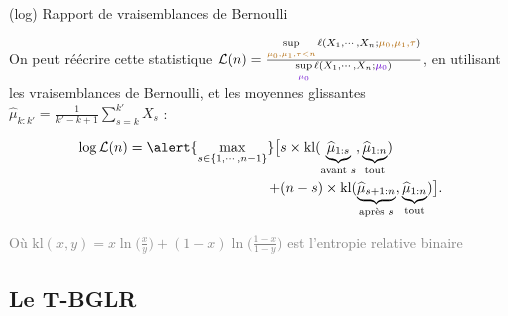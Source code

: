\documentclass[11pt,french,ignorenonframetext,]{beamer}
\begin{document}
\begin{frame}{(log) Rapport de vraisemblances de Bernoulli}

  On peut réécrire cette statistique
  $\mathcal{L}(n) = \frac{\sup\limits_{\textcolor{gold}{\mu_0,\mu_1,\tau < n}}\ell(X_1,\cdots,X_n ; \textcolor{gold}{\mu_0,\mu_1,\tau})}{\sup\limits_{\textcolor{deeppurple}{\mu_0}}\ell(X_1,\cdots,X_n ;\textcolor{deeppurple}{\mu_0})}$,
  en utilisant les vraisemblances de Bernoulli, et les moyennes glissantes $\widehat{\mu}_{k:k'} = \frac{1}{k'-k+1} \sum\limits_{s=k}^{k'} X_s$ :

  \begin{align*}
    \log \mathcal{L}(n) = \alert{\max_{s \in \{1,\cdots,n-1\}}} \bigl[
      & s \times \mathrm{kl} (\underbrace{\widehat{\mu}_{1:s}}_{\text{avant } s},\underbrace{\widehat{\mu}_{1:n}}_{\text{tout}} ) \\
      + & (n-s) \times \mathrm{kl} (\underbrace{\widehat{\mu}_{s+1:n}}_{\text{après } s},\underbrace{\widehat{\mu}_{1:n}}_{\text{tout}} ) \bigr].
  \end{align*}

  \begin{small}
    \textcolor{gray}{Où $\mathrm{kl}(x,y) =x \ln\bigl(\frac{x}{y}\bigr) + (1-x)\ln\bigl(\frac{1-x}{1-y}\bigr)$ est l'entropie relative binaire}
  \end{small}

\end{frame}


\subsection{\hfill{}Le T-BGLR\hfill{}}


\end{document}
